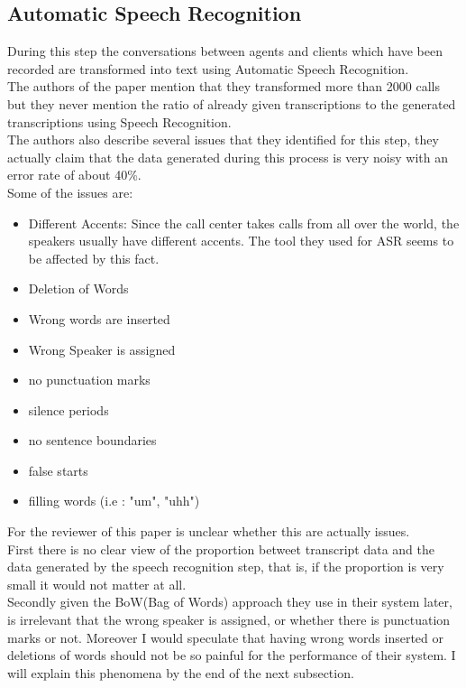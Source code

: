 \documentclass[4pt,a4paper,twocolumn]{article}
\begin{document}
\subsection{Automatic Speech Recognition}
		
During this step the conversations between agents and clients which have been recorded are transformed into text using Automatic Speech Recognition.\\
The authors of the paper mention that they transformed more than 2000 calls  but they never mention the ratio of already given transcriptions to the generated transcriptions using Speech Recognition.\\
The authors also describe several issues that they identified for this step, they actually claim that the data generated during this process is very noisy with an error rate of about 40\%.\\
Some of the issues are:
\begin{itemize}

	\item Different Accents: Since the call center takes calls from all over the world, the speakers usually have different accents. The tool they used for ASR seems to be affected by this fact.
	
	\item Deletion of Words 
	
	\item Wrong words are inserted
	
	\item Wrong Speaker is assigned
	
	\item no punctuation marks
	
	\item silence periods
	
	\item no sentence boundaries
	
	\item false starts
	
	\item filling words (i.e : "um", "uhh")
\end{itemize}

For the reviewer of this paper is unclear whether this are actually issues.\\
First there is no clear view of the proportion betweet transcript data and the data generated by the speech recognition step, that is, if the proportion is very small it would not matter at all.\\
Secondly given the BoW(Bag of Words) approach they use in their system later, is irrelevant that the wrong speaker is assigned, or whether there is punctuation marks or not. Moreover I would speculate that having wrong words inserted or deletions of words should not be so painful for the performance of their system. I will explain this phenomena by the end of the next subsection.
\end{document}
